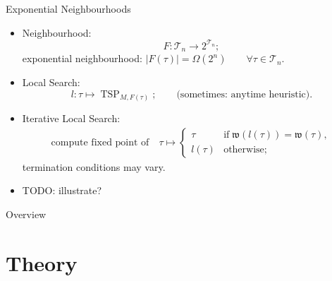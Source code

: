 \documentclass[
  size=10pt,
  style=klope,
  paper=screen,
  pauseslide,
  nopagebreaks,
  fleqn
]{powerdot}
\def\todo{\color{red}}
\def\eqitspace{\vspace{-5mm}}
\begin{document}
\begin{slide}{Exponential Neighbourhoods}
\begin{itemize}
  \item
  Neighbourhood:
  \begin{equation}
    F: \mathcal{T}_n \to 2^{\mathcal{T}_n};
  \end{equation}
  exponential neighbourhood:
  $\left\vert F(\tau) \right\vert = \Omega(2^n) \qquad \forall \tau \in \mathcal{T}_n$.
  \item
  Local Search:
  \begin{equation}
    l: \tau \mapsto \operatorname{TSP}_{M,F(\tau)};
    \qquad \text{(sometimes: anytime heuristic)}.
  \end{equation}
  \eqitspace
  \item
  Iterative Local Search:
  \begin{align}
    \text{compute fixed point of}
    \quad
    \tau \mapsto
    \begin{cases}
      \tau \quad & \text{if} \; \mathfrak{w}\left(l\left(\tau\right)\right) = \mathfrak{w}\left(\tau\right),
      \\
      l\left(\tau\right) & \text{otherwise};
    \end{cases}
  \end{align}
  termination conditions may vary.
  \item
  {\todo TODO:} illustrate?
\end{itemize}
\end{slide}

\begin{slide}[toc=,bm=]{Overview}
\tableofcontents[content=currentsection,type=1]
\end{slide}

\section[template=wideslide]{Theory}
\end{document}
